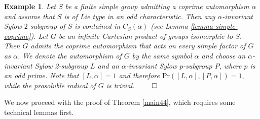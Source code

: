 \documentclass[12pt]{amsart}
\newtheorem{example}[theorem]{\sc Example}
\newcommand{\al }{\alpha }
\newcommand{\pr }{\mathrm{Pr} }
\begin{document}
 \begin{example}\label{es1}
{\rm Let $S$ be a finite simple group admitting a coprime automorphism $\al$ and assume that $S$ is of Lie type in an odd characteristic. 
  Then any $\alpha$-invariant Sylow $2$-subgroup of $S$ is contained in $C_S(\alpha)$ (see Lemma \ref{lemma-simple-coprime}). 
 Let $G$ be an infinite Cartesian product of groups isomorphic to $S$. Then $G$ admits the coprime automorphism that acts on every simple factor of $G$ as $\al$. We denote the automorphism of $G$ by the same symbol $\al$ and choose an $\al$-invariant Sylow 2-subgroup $L$ and an $\al$-invariant Sylow $p$-subgroup $P$, where $p$ is an odd prime. Note that $[L,\al]=1$ and therefore $\pr([L,\al],[P,\al])=1,$ while the prosoluble radical of $G$ is trivial.} $\qed$
\end{example}

We now proceed with the proof of Theorem \ref{main44}, which requires some technical lemmas first.
\end{document}

